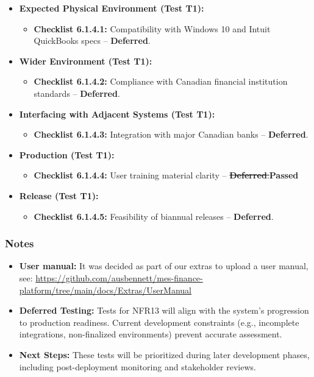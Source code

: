 \documentclass[12pt, titlepage]{article}
\begin{document}
\begin{itemize}
    \item \textbf{Expected Physical Environment (Test T1):}  
    \begin{itemize}
        \item \textbf{Checklist 6.1.4.1:} Compatibility with Windows 10 and Intuit QuickBooks specs – \textbf{Deferred}.  
    \end{itemize}
    
    \item \textbf{Wider Environment (Test T1):}  
    \begin{itemize}
        \item \textbf{Checklist 6.1.4.2:} Compliance with Canadian financial institution standards – \textbf{Deferred}.  
    \end{itemize}
    
    \item \textbf{Interfacing with Adjacent Systems (Test T1):}  
    \begin{itemize}
        \item \textbf{Checklist 6.1.4.3:} Integration with major Canadian banks – \textbf{Deferred}.  
    \end{itemize}
    
    \item \textbf{Production (Test T1):}  
    \begin{itemize}
        \item \textbf{Checklist 6.1.4.4:} User training material clarity – \st{\textbf{Deferred}.}\textbf{Passed}
    \end{itemize}
    
    \item \textbf{Release (Test T1):}  
    \begin{itemize}
        \item \textbf{Checklist 6.1.4.5:} Feasibility of biannual releases – \textbf{Deferred}.  
    \end{itemize}
\end{itemize}

\subsubsection*{Notes}  
\begin{itemize}
    \item \textbf{User manual:} It was decided as part of our extras to upload a user manual, see: \url{https://github.com/ausbennett/mes-finance-platform/tree/main/docs/Extras/UserManual}
    \item \textbf{Deferred Testing:} Tests for NFR13 will align with the system’s progression to production readiness. Current development constraints (e.g., incomplete integrations, non-finalized environments) prevent accurate assessment.  
    \item \textbf{Next Steps:} These tests will be prioritized during later development phases, including post-deployment monitoring and stakeholder reviews.  
\end{itemize}
\end{document}
